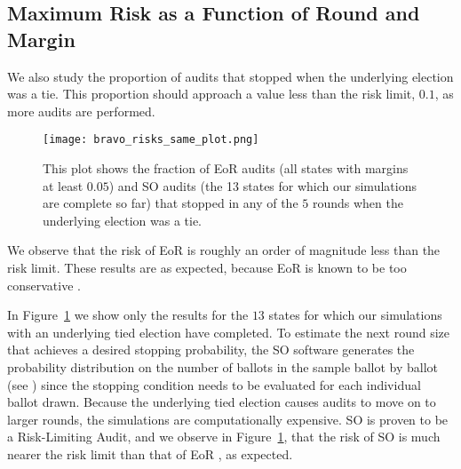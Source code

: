 \subsection{Maximum Risk as a Function of Round and Margin}
We also study the proportion of audits that stopped when the underlying election was a tie.
This proportion should approach a value less than the risk limit, $0.1$, as more audits are performed.


\begin{figure}
\begin{centering}
\texttt{[image: bravo\_risks\_same\_plot.png]}
\caption{This plot shows the fraction of EoR \BRAVO audits (all states with margins at least $0.05$) and SO \BRAVO audits (the 13 states for which our simulations are complete so far) that stopped in any of the $5$ rounds when the underlying election was a tie.}
\label{fig:bravo_risk}
\end{centering}
\end{figure}

We observe that the risk of EoR \BRAVO is roughly
an order of magnitude less than the risk limit. 
These results are as expected, because EoR \BRAVO is known to be too conservative \cite{usenix_minerva}.  

In Figure~\ref{fig:bravo_risk} we show only the results for the $13$
states for which our simulations with an underlying tied election have completed.
To estimate the next round size that achieves a desired stopping probability,
the SO \BRAVO software generates the probability distribution on the number of ballots in the sample ballot by ballot (see \cite{usenix_minerva}) since
the stopping condition needs to be evaluated for each individual ballot drawn.
Because the underlying tied election causes audits to move on to larger rounds, 
the simulations are computationally expensive. SO \BRAVO is proven to be a Risk-Limiting Audit,
and we observe in Figure~\ref{fig:bravo_risk},
that the risk of SO \BRAVO is much
nearer the risk limit than that of EoR \BRAVO, as expected. 


